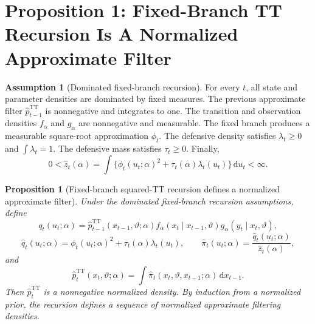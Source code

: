 \documentclass[11pt]{article}
\newcommand{\dd}{\mathrm{d}}
\newcommand{\TT}{\mathrm{TT}}
\newtheorem{proposition}{Proposition}
\theoremstyle{definition}
\newtheorem{assumption}{Assumption}
\theoremstyle{remark}
\begin{document}
\section{Proposition 1: Fixed-Branch TT Recursion Is A Normalized Approximate Filter}

\begin{assumption}[Dominated fixed-branch recursion]
For every \(t\), all state and parameter densities are dominated by fixed
measures.  The previous approximate filter
\(\widehat p_{t-1}^{\TT}\) is nonnegative and integrates to one.  The transition
and observation densities \(f_\alpha\) and \(g_\alpha\) are nonnegative and
measurable.  The fixed branch produces a measurable square-root approximation
\(\phi_t\).  The defensive density satisfies \(\lambda_t\ge0\) and
\(\int\lambda_t=1\).  The defensive mass satisfies \(\tau_t\ge0\).  Finally,
\[
  0<\widehat z_t(\alpha)
  =
  \int\{\phi_t(u_t;\alpha)^2+\tau_t(\alpha)\lambda_t(u_t)\}\,\dd u_t
  <\infty.
\]
\end{assumption}

\begin{proposition}[Fixed-branch squared-TT recursion defines a normalized approximate filter]
Under the dominated fixed-branch recursion assumptions, define
\[
  q_t(u_t;\alpha)
  =
  \widehat p_{t-1}^{\TT}(x_{t-1},\vartheta;\alpha)
  f_\alpha(x_t\mid x_{t-1},\vartheta)
  g_\alpha(y_t\mid x_t,\vartheta),
\]
\[
  \widehat q_t(u_t;\alpha)
  =
  \phi_t(u_t;\alpha)^2+\tau_t(\alpha)\lambda_t(u_t),
  \qquad
  \widehat\pi_t(u_t;\alpha)
  =
  \frac{\widehat q_t(u_t;\alpha)}{\widehat z_t(\alpha)},
\]
and
\[
  \widehat p_t^{\TT}(x_t,\vartheta;\alpha)
  =
  \int
  \widehat\pi_t(x_t,\vartheta,x_{t-1};\alpha)
  \,\dd x_{t-1}.
  \label{eq:p12-fixed-filter-marginal}
\]
Then \(\widehat p_t^{\TT}\) is a nonnegative normalized density.  By induction
from a normalized prior, the recursion defines a sequence of normalized
approximate filtering densities.
\end{proposition}
\end{document}
